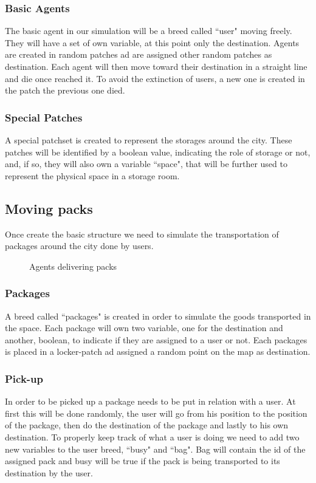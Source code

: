 \documentclass[11pt,a4paper]{article}
\begin{document}
\subsubsection*{Basic Agents}
The basic agent in our simulation will be a breed called “user" moving freely.
They will have a set of own variable, at this point only the destination.
Agents are created in random patches ad are assigned other random patches as destination.
Each agent will then move toward their destination in a straight line and die once reached it.
To avoid the extinction of users, a new one is created in the patch the previous one died.

\subsubsection*{Special Patches}
A special patchset is created to represent the storages around the city.
These patches will be identified by a boolean value, indicating the role of storage or not, and, if so, they will also own a variable “space", that will be further used to represent the physical space in a storage room.

\newpage
\subsection{Moving packs}
Once create the basic structure we need to simulate the transportation of packages around the city done by users.
\medskip
\begin{figure}[h!]
\centering
\caption{Agents delivering packs}
\end{figure}
\medskip
\subsubsection*{Packages}
A breed called “packages" is created in order to simulate the goods transported in the space. Each package will own two variable, one for the destination and another, boolean, to indicate if they are assigned to a user or not.
Each packages is placed in a locker-patch ad assigned a random point on the map as destination.

\medskip
\subsubsection*{Pick-up}
In order to be picked up a package needs to be put in relation with a user.
At first this will be done randomly, the user will go from his position to the position of the package, then do the destination of the package and lastly to his own destination.
To properly keep track of what a user is doing we need to add two new variables to the user breed, “busy" and “bag". Bag will contain the id of the assigned pack and busy will be true if the pack is being transported to its destination by the user.
\end{document}
